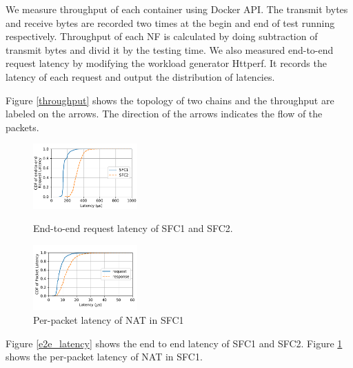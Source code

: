 We measure throughput of each container using Docker API. 
The transmit bytes and receive bytes are recorded two times 
at the begin and end of test running respectively. 
Throughput of each NF is calculated 
by doing subtraction of transmit bytes and divid it by the testing time. 
We also measured end-to-end request latency by modifying the workload generator Httperf. 
It records the latency of each request and output the distribution of latencies.

Figure \ref{throughput} shows the topology of two chains 
and the throughput are labeled on the arrows. 
The direction of the arrows indicates the flow of the packets.






\begin{figure}   
  \begin{minipage}[t]{0.47\columnwidth}  
    \centering
    \includegraphics[width=4.0cm]{fig/e2e_latency_chain12.pdf}  
     
    \caption{\small{End-to-end request latency of SFC1 and SFC2.}}  
    \label{e2e_latency}   
  \end{minipage}%
  \hfill 
  \hfill 
  \begin{minipage}[t]{0.47\columnwidth}
    \centering   
    \includegraphics[width=4.0cm]{fig/cdf_chain1.pdf}   
    \caption{\small{Per-packet latency of NAT in SFC1}}  
    \label{nat_latency}   
  \end{minipage}  

\end{figure}

Figure \ref{e2e_latency} shows the end to end latency of SFC1 and SFC2. 
Figure \ref{nat_latency} shows the per-packet latency of NAT in SFC1. 




